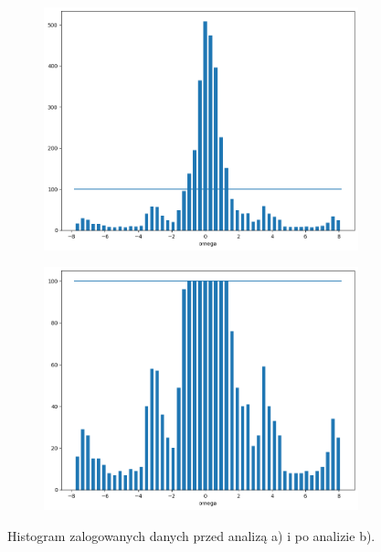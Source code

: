 \documentclass[conference]{IEEEtran}
\begin{document}
\begin{figure}[h]
	\begin{subfigure}{.475\columnwidth}
    	\centering
    	\includegraphics[width=1\columnwidth]{h1}
    	\caption{}
    	\label{fig:cnn-data-hist1}
    \end{subfigure}
    \begin{subfigure}{.475\columnwidth}
    	\centering
    	\includegraphics[width=1\columnwidth]{h2}
    	\caption{}
    	\label{fig:cnn-data-hist2}
    \end{subfigure}
    
    \caption{Histogram zalogowanych danych przed analizą a) i po analizie b).}
    \label{fig:cnn-data-hist}
\end{figure}
\end{document}
